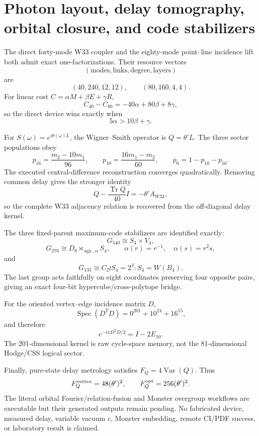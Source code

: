 \section{Photon layout, delay tomography, orbital closure, and code stabilizers}
\label{sec:bt3997-4004}

The direct forty-mode W33 coupler and the eighty-mode point--line incidence lift both admit exact one-factorizations. Their resource vectors
\[
 (\text{modes},\text{links},\text{degree},\text{layers})
\]
are
\[
 (40,240,12,12),\qquad(80,160,4,4).
\]
For linear cost $C=\alpha M+\beta E+\gamma R$,
\[
 C_{40}-C_{80}=-40\alpha+80\beta+8\gamma,
\]
so the direct device wins exactly when
\[
 \boxed{5\alpha>10\beta+\gamma}.
\]

For $S(\omega)=e^{i\theta(\omega)L}$, the Wigner--Smith operator is $Q=\theta' L$. The three sector populations obey
\[
 p_{16}=\frac{m_2-10m_1}{96},\qquad
 p_{10}=\frac{16m_1-m_2}{60},\qquad
 p_0=1-p_{10}-p_{16}.
\]
The executed central-difference reconstruction converges quadratically. Removing common delay gives the stronger identity
\[
 \boxed{Q-\frac{\operatorname{Tr}Q}{40}I=-\theta' A_{W33}},
\]
so the complete W33 adjacency relation is recovered from the off-diagonal delay kernel.

The three fixed-parent maximum-code stabilizers are identified exactly:
\[
 G_{540}\cong S_4\times V_4,
\]
\[
 G_{270}\cong D_8\rtimes_{\operatorname{sgn},\alpha}S_4,
 \qquad \alpha(r)=r^{-1},\quad\alpha(s)=r^2s,
\]
and
\[
 \boxed{G_{135}\cong C_2\wr S_4=2^4:S_4=W(B_4).}
\]
The last group acts faithfully on eight coordinates preserving four opposite pairs, giving an exact four-bit hypercube/cross-polytope bridge.

For the oriented vertex--edge incidence matrix $D$,
\[
 \operatorname{Spec}(D^TD)=0^{201}+10^{24}+16^{15},
\]
and therefore
\[
 \boxed{e^{-i\pi D^TD/2}=I-2E_{10}}.
\]
The 201-dimensional kernel is raw cycle-space memory, not the 81-dimensional Hodge/CSS logical sector.

Finally, pure-state delay metrology satisfies $F_Q=4\operatorname{Var}(Q)$. Thus
\[
 F_Q^{\rm vertex}=48(\theta')^2,
 \qquad
 F_Q^{\rm opt}=256(\theta')^2.
\]
The literal orbital Fourier/relation-fusion and Monster overgroup workflows are executable but their generated outputs remain pending. No fabricated device, measured delay, variable vacuum $c$, Monster embedding, remote CI/PDF success, or laboratory result is claimed.

